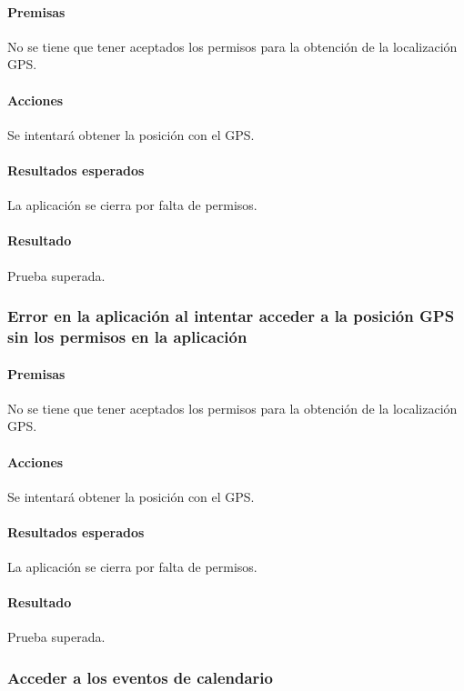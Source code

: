 \paragraph{Premisas}
No se tiene que tener aceptados los permisos para la obtención de la localización GPS.


\paragraph{Acciones}
Se intentará obtener la posición con el GPS.

\paragraph{Resultados esperados}
La aplicación se cierra por falta de permisos.

\paragraph{Resultado}
Prueba superada.

\subsubsection{Error en la aplicación al intentar acceder a la posición GPS sin los permisos en la aplicación}

\paragraph{Premisas}
No se tiene que tener aceptados los permisos para la obtención de la localización GPS.


\paragraph{Acciones}
Se intentará obtener la posición con el GPS.

\paragraph{Resultados esperados}
La aplicación se cierra por falta de permisos.

\paragraph{Resultado}
Prueba superada.

\subsubsection{Acceder a los eventos de calendario}

